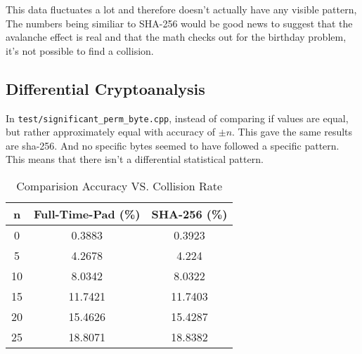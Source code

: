 \documentclass[fleqn, a4paper,12pt]{article}
\begin{document}
This data fluctuates a lot and therefore doesn't actually have any visible pattern, The numbers being similiar to SHA-256 would be good news to suggest that the avalanche effect is real and that the math checks out for the birthday problem, it's not possible to find a collision.

%


\subsection{Differential Cryptoanalysis}

In \texttt{test/significant\_perm\_byte.cpp}, instead of comparing if values are equal, but rather approximately equal with accuracy of $\pm n$. This gave the same results are sha-256. And no specific bytes seemed to have followed a specific pattern. This means that there isn't a differential statistical pattern.

\begin{table}[h!]
\centering
\begin{tabular}{|c|c|c|}
\hline
\textbf{n} & \textbf{Full-Time-Pad (\%)} & \textbf{SHA-256 (\%)} \\
\hline
		0 & 0.3883 & 0.3923 \\
\hline
		5 & 4.2678 & 4.224 \\
\hline
		10 & 8.0342 & 8.0322 \\
\hline
		15 & 11.7421 & 11.7403 \\
\hline
		20 & 15.4626 & 15.4287 \\
\hline
		25 & 18.8071 & 18.8382 \\
\hline
\end{tabular}
\caption{Comparision Accuracy VS. Collision Rate}
\end{table}
\end{document}
